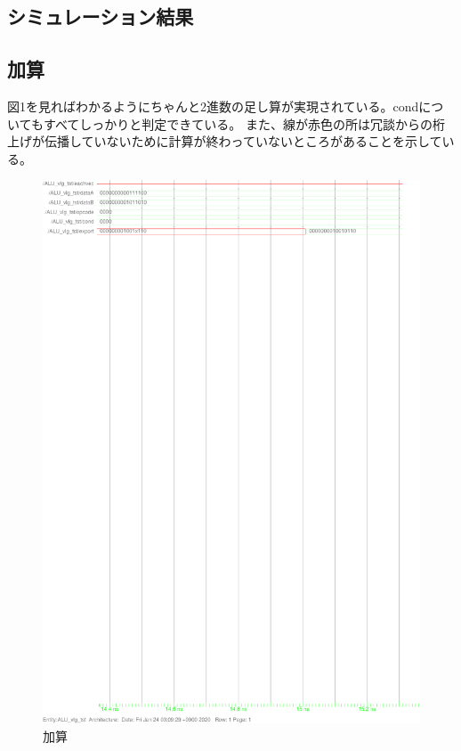 \documentclass{jsarticle}
\begin{document}
\subsection{シミュレーション結果}
\subsection{加算}
図1を見ればわかるようにちゃんと2進数の足し算が実現されている。condについてもすべてしっかりと判定できている。
また、線が赤色の所は冗談からの桁上げが伝播していないために計算が終わっていないところがあることを示している。
\begin{figure}
    \caption{加算}
  \includegraphics[scale=0.8]{ALU_add.ps}
\end{figure}
\end{document}
